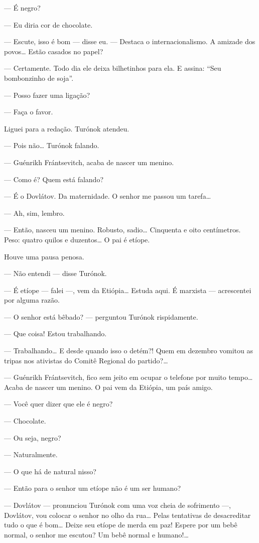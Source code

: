 --- É negro?

--- Eu diria cor de chocolate.

--- Escute, isso é bom --- disse eu. --- Destaca o internacionalismo. A
amizade dos povos\ldots{} Estão casados no papel?

--- Certamente. Todo dia ele deixa bilhetinhos para ela. E assina: ``Seu
bombonzinho de soja''.

--- Posso fazer uma ligação?

--- Faça o favor.

Liguei para a redação. Turónok atendeu.

--- Pois não\ldots{} Turónok falando.

--- Guénrikh Frántsevitch, acaba de nascer um menino.

--- Como é? Quem está falando?

--- É o Dovlátov. Da maternidade. O senhor me passou um tarefa\ldots{}

--- Ah, sim, lembro.

--- Então, nasceu um menino. Robusto, sadio\ldots{} Cinquenta e oito
centímetros. Peso: quatro quilos e duzentos\ldots{} O pai é etíope.

Houve uma pausa penosa.

--- Não entendi --- disse Turónok.

--- É etíope --- falei ---, vem da Etiópia\ldots{} Estuda aqui. É marxista
--- acrescentei por alguma razão.

--- O senhor está bêbado? --- perguntou Turónok rispidamente.

--- Que coisa! Estou trabalhando.

--- Trabalhando\ldots{} E desde quando isso o detém?! Quem em dezembro
vomitou as tripas nos ativistas do Comitê Regional do partido?\ldots{}

--- Guénrikh Frántsevitch, fico sem jeito em ocupar o telefone por muito
tempo\ldots{} Acaba de nascer um menino. O pai vem da Etiópia, um país amigo.

--- Você quer dizer que ele é negro?

--- Chocolate.

--- Ou seja, negro?

--- Naturalmente.

--- O que há de natural nisso?

--- Então para o senhor um etíope não é um ser humano?

--- Dovlátov --- pronunciou Turónok com uma voz cheia de sofrimento ---,
Dovlátov, vou colocar o senhor no olho da rua\ldots{} Pelas tentativas de
desacreditar tudo o que é bom\ldots{} Deixe seu etíope de merda em paz!
Espere por um bebê normal, o senhor me escutou? Um bebê normal e
humano!\ldots{}

